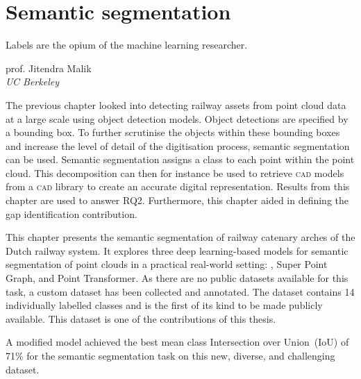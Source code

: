 \chapter{Semantic segmentation}\label{chap:semseg}
\epigraph{Labels are the opium of the machine learning researcher.}{prof. Jitendra Malik\\\textit{UC Berkeley}}

The previous chapter looked into detecting railway assets from point cloud data at a large scale using object detection models. Object detections are specified by a bounding box. To further scrutinise the objects within these bounding boxes and increase the level of detail of the digitisation process, semantic segmentation can be used. Semantic segmentation assigns a class to each point within the point cloud. This decomposition can then for instance be used to retrieve \textsc{cad} models from a \textsc{cad} library to create an accurate digital representation. Results from this chapter are used to answer RQ2. Furthermore, this chapter aided in defining the gap identification contribution.

This chapter presents the semantic segmentation of railway catenary arches of the Dutch railway system. It explores three deep learning-based models for semantic segmentation of point clouds in a practical real-world setting: \pnpp{}, Super Point Graph, and Point Transformer. As there are no public datasets available for this task, a custom dataset has been collected and annotated. The dataset contains 14 individually labelled classes and is the first of its kind to be made publicly available. This dataset is one of the contributions of this thesis.


A modified \pnpp{} model achieved the best mean class Intersection over Union~(IoU) of 71\% for the semantic segmentation task on this new, diverse, and challenging dataset.

\clearpage


\clearpage
\printbibliography[heading=subbibnumbered]